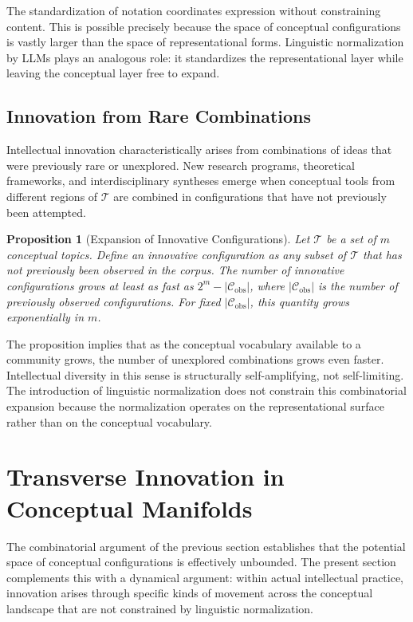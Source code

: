 \documentclass[12pt,a4paper]{article}
\theoremstyle{definition}
\theoremstyle{plain}
\newtheorem{proposition}[definition]{Proposition}
\theoremstyle{remark}
\newcommand{\calC}{\mathcal{C}}
\newcommand{\calT}{\mathcal{T}}
\begin{document}
The standardization of notation coordinates expression without constraining content. This is
possible precisely because the space of conceptual configurations is vastly larger than the
space of representational forms. Linguistic normalization by LLMs plays an analogous role:
it standardizes the representational layer while leaving the conceptual layer free to expand.

\subsection{Innovation from Rare Combinations}

Intellectual innovation characteristically arises from combinations of ideas that were
previously rare or unexplored. New research programs, theoretical frameworks, and
interdisciplinary syntheses emerge when conceptual tools from different regions of $\calT$
are combined in configurations that have not previously been attempted.

\begin{proposition}[Expansion of Innovative Configurations]
\label{prop:expansion}
Let $\calT$ be a set of $m$ conceptual topics. Define an \emph{innovative configuration} as
any subset of $\calT$ that has not previously been observed in the corpus. The number of
innovative configurations grows at least as fast as $2^m - |\calC_{\mathrm{obs}}|$, where
$|\calC_{\mathrm{obs}}|$ is the number of previously observed configurations. For fixed
$|\calC_{\mathrm{obs}}|$, this quantity grows exponentially in $m$.
\end{proposition}

The proposition implies that as the conceptual vocabulary available to a community grows,
the number of unexplored combinations grows even faster. Intellectual diversity in this sense
is structurally self-amplifying, not self-limiting. The introduction of linguistic
normalization does not constrain this combinatorial expansion because the normalization
operates on the representational surface rather than on the conceptual vocabulary.

\section{Transverse Innovation in Conceptual Manifolds}
\label{sec:transverse}

The combinatorial argument of the previous section establishes that the potential space of
conceptual configurations is effectively unbounded. The present section complements this with
a dynamical argument: within actual intellectual practice, innovation arises through specific
kinds of movement across the conceptual landscape that are not constrained by linguistic
normalization.
\end{document}

